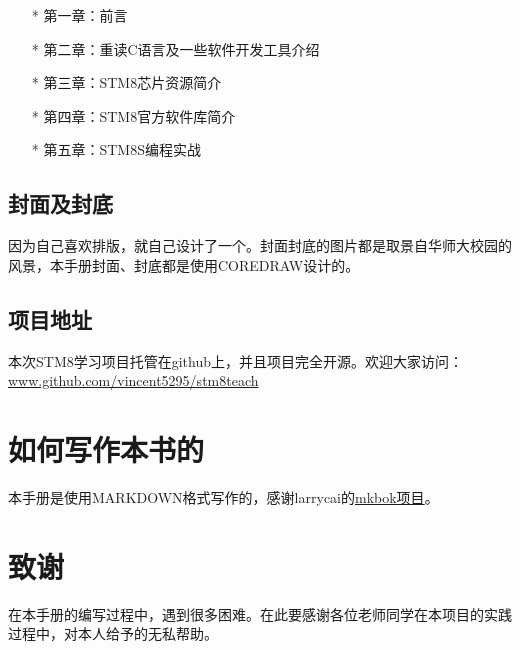 \documentclass[a4paper]{book}
\makeatletter
\let\savedtitle=\@title
\newcounter{tab}[chapter]
\makeatother
\begin{document}
\begin{itemize}\setlength{\itemsep}{1pt}\setlength{\parskip}{0pt}\setlength{\parsep}{0pt}
\item[*]
  第一章：前言
\item[*]
  第二章：重读C语言及一些软件开发工具介绍
\item[*]
  第三章：STM8芯片资源简介
\item[*]
  第四章：STM8官方软件库简介
\item[*]
  第五章：STM8S编程实战
\end{itemize}
\subsection*{封面及封底}

因为自己喜欢排版，就自己设计了一个。封面封底的图片都是取景自华师大校园的风景，本手册封面、封底都是使用COREDRAW设计的。

\subsection*{项目地址}

本次STM8学习项目托管在github上，并且项目完全开源。欢迎大家访问：\href{www.github.com/vincent5295/stm8teach}{www.github.com/vincent5295/stm8teach}

\section*{如何写作本书的}

本手册是使用MARKDOWN格式写作的，感谢larrycai的\href{www.github.com/larrycai/mkbok}{mkbok项目}。

\section*{致谢}

在本手册的编写过程中，遇到很多困难。在此要感谢各位老师同学在本项目的实践过程中，对本人给予的无私帮助。

\tableofcontents\newpage\thispagestyle{empty}


\fancyhf{}
\fancyhead[LE]{\color{colorheader}\quad\small\textbf\thepage\quad\quad\small\leftmark}
\fancyhead[RO]{\color{colorheader}\small\rightmark\quad\quad\small\textbf\thepage\quad}
\end{document}
